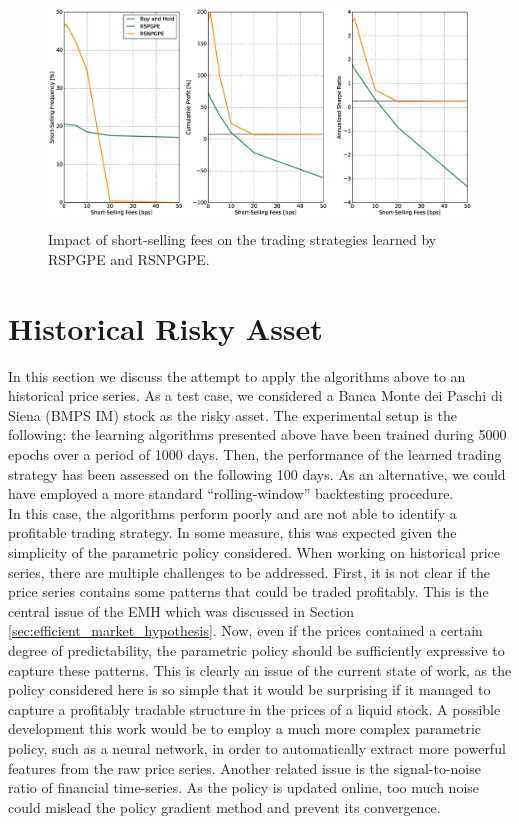 \begin{figure}[t!]
\centering
\includegraphics[height=6cm,width=1\linewidth]{Images/8_7_impact_short_selling_fees_RS}
\caption[Short-selling fees and risk-sensitive strategies]{Impact of short-selling fees on the trading strategies learned by RSPGPE and RSNPGPE.}
\label{fig:8_7_impact_short_selling_fees_RS}
\end{figure}

\clearpage
\section{Historical Risky Asset}
In this section we discuss the attempt to apply the algorithms above to an historical price series. As a test case, we considered a Banca Monte dei Paschi di Siena (BMPS IM) stock as the risky asset. The experimental setup is the following: the learning algorithms presented above have been trained during 5000 epochs over a period of 1000 days. Then, the performance of the learned trading strategy has been assessed on the following 100 days. As an alternative, we could have employed a more standard ``rolling-window'' backtesting procedure.\\
In this case, the algorithms perform poorly and are not able to identify a profitable trading strategy. In some measure, this was expected given the simplicity of the parametric policy considered. When working on historical price series, there are multiple challenges to be addressed. First, it is not clear if the price series contains some patterns that could be traded profitably. This is the central issue of the \gls{EMH} which was discussed in Section \ref{sec:efficient_market_hypothesis}. Now, even if the prices contained a certain degree of predictability, the parametric policy should be sufficiently expressive to capture these patterns. This is clearly an issue of the current state of work, as the policy considered here is so simple that it would be surprising if it managed to capture a profitably tradable structure in the prices of a liquid stock. A possible development this work would be to employ a much more complex parametric policy, such as a neural network, in order to automatically extract more powerful features from the raw price series. Another related issue is the signal-to-noise ratio of financial time-series. As the policy is updated online, too much noise could mislead the policy gradient method and prevent its convergence.

